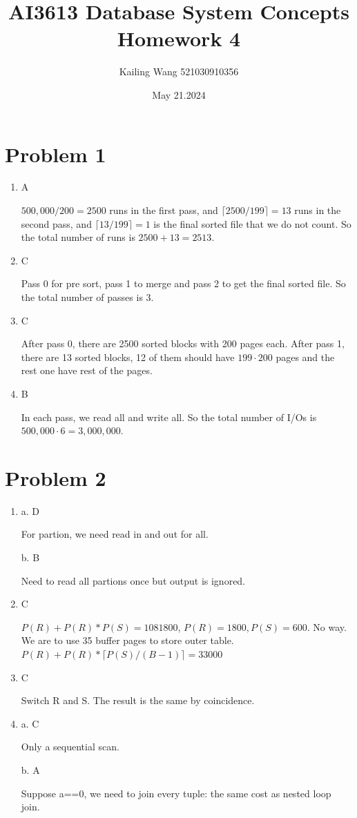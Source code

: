 \documentclass{article}
\begin{document}
\title{AI3613 Database System Concepts Homework 4}
\author{Kailing Wang 521030910356}
\date{May 21.2024}
\maketitle

\section*{Problem 1}

\begin{enumerate}[1.]
	\item A
	
	$500, 000/200 = 2500$ runs in the first pass, and $\lceil 2500/199 \rceil = 13$ runs in the second pass, and $\lceil 13/199 \rceil = 1$ is the final sorted file that we do not count. So the total number of runs is $2500+13=2513$.

	\item C

	Pass 0 for pre sort, pass 1 to merge and pass 2 to get the final sorted file. So the total number of passes is 3.

	\item C

	After pass 0, there are 2500 sorted blocks with 200 pages each. After pass 1, there are 13 sorted blocks, 12 of them should have $199\cdot 200$ pages and the rest one have rest of the pages.

	\item B

	In each pass, we read all and write all. So the total number of I/Os is $500, 000 \cdot 6 = 3, 000, 000$.
\end{enumerate}

\section*{Problem 2}
\begin{enumerate}
	\item a. D
	
	For partion, we need read in and out for all.

	b. B

	Need to read all partions once but output is ignored.

	\item C
	
	$P(R) + P(R) * P(S)=1081800$, $P(R) = 1800, P(S) = 600$. No way. We are to use 35 buffer pages to store outer table. $P(R) + P(R) * \lceil P(S)/(B-1)\rceil=33000$

	\item C

	Switch R and S. The result is the same by coincidence.

	\item a. C

	Only a sequential scan.

	b. A

	Suppose a==0, we need to join every tuple: the same cost as nested loop join.
\end{enumerate}
\end{document}
